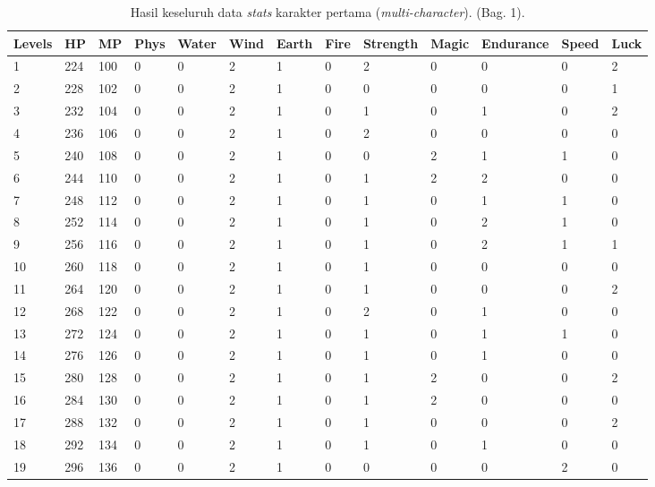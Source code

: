\begin{sidewaystable}[!h]
	\centering
	\caption{Hasil keseluruh data \textit{stats} karakter pertama (\textit{multi-character}). (Bag. 1).}
	\label{tb:player_all_stats_1_1}
	\vspace{1ex}
	\begin{tabular}{|l|l|l|l|l|l|l|l|l|l|l|l|l|}
		\hline
		\rowcolor[HTML]{C0C0C0} 
		\textbf{Levels} & \textbf{HP} & \textbf{MP} & \textbf{Phys} & \textbf{Water} & \textbf{Wind} & \textbf{Earth} & \textbf{Fire} & \textbf{Strength} & \textbf{Magic} & \textbf{Endurance} & \textbf{Speed} & \textbf{Luck} \\ \hline
		1 & 224 & 100 & 0 & 0 & 2 & 1 & 0 & 2 & 0 & 0 & 0 & 2 \\ \hline
		2 & 228 & 102 & 0 & 0 & 2 & 1 & 0 & 0 & 0 & 0 & 0 & 1 \\ \hline
		3 & 232 & 104 & 0 & 0 & 2 & 1 & 0 & 1 & 0 & 1 & 0 & 2 \\ \hline
		4 & 236 & 106 & 0 & 0 & 2 & 1 & 0 & 2 & 0 & 0 & 0 & 0 \\ \hline
		5 & 240 & 108 & 0 & 0 & 2 & 1 & 0 & 0 & 2 & 1 & 1 & 0 \\ \hline
		6 & 244 & 110 & 0 & 0 & 2 & 1 & 0 & 1 & 2 & 2 & 0 & 0 \\ \hline
		7 & 248 & 112 & 0 & 0 & 2 & 1 & 0 & 1 & 0 & 1 & 1 & 0 \\ \hline
		8 & 252 & 114 & 0 & 0 & 2 & 1 & 0 & 1 & 0 & 2 & 1 & 0 \\ \hline
		9 & 256 & 116 & 0 & 0 & 2 & 1 & 0 & 1 & 0 & 2 & 1 & 1 \\ \hline
		10 & 260 & 118 & 0 & 0 & 2 & 1 & 0 & 1 & 0 & 0 & 0 & 0 \\ \hline
		11 & 264 & 120 & 0 & 0 & 2 & 1 & 0 & 1 & 0 & 0 & 0 & 2 \\ \hline
		12 & 268 & 122 & 0 & 0 & 2 & 1 & 0 & 2 & 0 & 1 & 0 & 0 \\ \hline
		13 & 272 & 124 & 0 & 0 & 2 & 1 & 0 & 1 & 0 & 1 & 1 & 0 \\ \hline
		14 & 276 & 126 & 0 & 0 & 2 & 1 & 0 & 1 & 0 & 1 & 0 & 0 \\ \hline
		15 & 280 & 128 & 0 & 0 & 2 & 1 & 0 & 1 & 2 & 0 & 0 & 2 \\ \hline
		16 & 284 & 130 & 0 & 0 & 2 & 1 & 0 & 1 & 2 & 0 & 0 & 0 \\ \hline
		17 & 288 & 132 & 0 & 0 & 2 & 1 & 0 & 1 & 0 & 0 & 0 & 2 \\ \hline
		18 & 292 & 134 & 0 & 0 & 2 & 1 & 0 & 1 & 0 & 1 & 0 & 0 \\ \hline
		19 & 296 & 136 & 0 & 0 & 2 & 1 & 0 & 0 & 0 & 0 & 2 & 0 \\ \hline

\end{tabular}
\end{sidewaystable}
